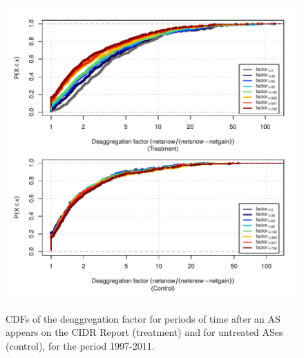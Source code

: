 
\begin{figure}[h!]
\begin{centering}
\begin{singlespace}
    \includegraphics[width=6in]
        {figures/behavior-deagg_factor-1997_2011-corr.pdf}
    \vspace{-2em}\\
    \caption{CDFs of the deaggregation factor for periods of time after an AS
    appears on the CIDR Report (treatment) and for untreated ASes (control),
    for the period 1997-2011.}
    \label{fig:deagg_factor_cdf}
\end{singlespace}
\end{centering}
\end{figure}

